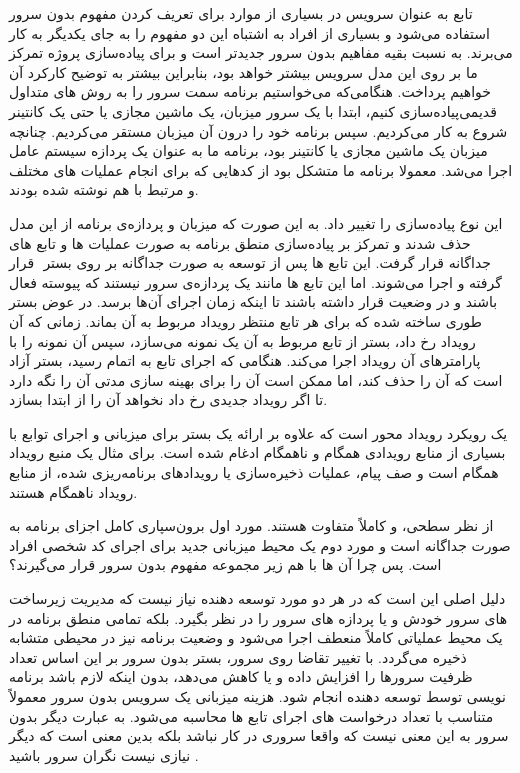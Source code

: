 تابع به عنوان سرویس در بسیاری از موارد برای تعریف کردن مفهوم بدون سرور استفاده می‌شود و بسیاری از افراد به اشتباه این دو مفهوم را به جای یکدیگر به کار می‌برند.  به نسبت بقیه مفاهیم بدون سرور جدیدتر است و برای پیاده‌سازی پروژه تمرکز ما بر روی این مدل سرویس بیشتر خواهد بود، بنابراین بیشتر به توضیح کارکرد آن خواهیم پرداخت.
هنگامی‌که می‌خواستیم برنامه سمت سرور را به روش های متداول قدیمی‌پیاده‌سازی کنیم، ابتدا با یک سرور میزبان، یک ماشین مجازی یا حتی یک کانتینر شروع به کار می‌کردیم. سپس برنامه خود را درون آن میزبان مستقر می‌کردیم. چنانچه میزبان یک ماشین مجازی یا کانتینر بود، برنامه ما به عنوان یک پردازه سیستم عامل اجرا می‌شد. معمولا برنامه ما متشکل بود از کدهایی که برای انجام عملیات های مختلف و مرتبط با هم نوشته شده بودند.

 این نوع پیاده‌سازی را تغییر داد. به این صورت که میزبان و پردازه‌ی برنامه از این مدل حذف شدند و تمرکز بر پیاده‌سازی منطق برنامه به صورت عملیات ها و تابع های جداگانه قرار گرفت. این تابع ها پس از توسعه به صورت جداگانه بر روی بستر ‌ قرار گرفته و اجرا می‌شوند. اما این تابع ها مانند یک پردازه‌ی سرور نیستند که  پیوسته فعال باشند و در وضعیت  قرار داشته باشند تا اینکه زمان اجرای آن‌ها برسد. در عوض بستر  طوری ساخته شده که برای هر تابع منتظر رویداد مربوط به آن بماند. زمانی که آن رویداد رخ داد، بستر از تابع مربوط به آن یک نمونه می‌سازد، سپس آن نمونه را با پارامترهای آن رویداد اجرا می‌کند. هنگامی که اجرای تابع به اتمام رسید، بستر  آزاد است که آن را حذف کند، اما ممکن است آن را برای بهینه سازی مدتی آن را نگه دارد تا اگر رویداد جدیدی رخ داد نخواهد آن را از ابتدا بسازد.

 یک رویکرد رویداد محور است که علاوه بر ارائه یک بستر برای میزبانی و اجرای توابع با بسیاری از منابع رویدادی همگام و ناهمگام ادغام شده است. برای مثال  یک منبع رویداد همگام است و صف پیام، عملیات ذخیره‌سازی یا رویدادهای برنامه‌ریزی شده، از منابع رویداد ناهمگام هستند.

از نظر سطحی،  و  کاملاً متفاوت هستند. مورد اول برون‌سپاری کامل اجزای برنامه به صورت جداگانه است و مورد  دوم یک محیط میزبانی جدید برای اجرای کد شخصی افراد است. پس چرا آن ها با هم زیر مجموعه مفهوم بدون سرور قرار می‌گیرند؟

دلیل اصلی این است که در هر دو مورد توسعه دهنده نیاز نیست که مدیریت زیرساخت های سرور خودش و یا پردازه های سرور را در نظر بگیرد. بلکه تمامی منطق برنامه در یک محیط عملیاتی کاملاً منعطف اجرا می‌شود و وضعیت برنامه نیز در محیطی متشابه ذخیره می‌گردد. با تغییر تقاضا روی سرور، بستر بدون سرور بر این اساس تعداد ظرفیت سرورها را افزایش داده و یا کاهش می‌دهد، بدون اینکه لازم باشد برنامه نویسی توسط توسعه دهنده انجام شود. هزینه میزبانی یک سرویس بدون سرور معمولاً متناسب با تعداد درخواست های اجرای تابع ها محاسبه می‌شود. به عبارت دیگر بدون سرور به این معنی نیست که واقعا سروری در کار نباشد بلکه بدین معنی است که دیگر نیازی نیست نگران سرور باشید \cite{roberts_chapin_2017}.

